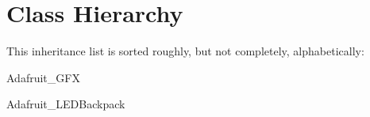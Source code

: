 \section{Class Hierarchy}
This inheritance list is sorted roughly, but not completely, alphabetically\+:\begin{DoxyCompactList}
\item Adafruit\+\_\+\+G\+FX\begin{DoxyCompactList}
\item {}
\begin{DoxyCompactList}
\item {}
\end{DoxyCompactList}
\end{DoxyCompactList}
\item Adafruit\+\_\+\+L\+E\+D\+Backpack\begin{DoxyCompactList}
\item {}
\end{DoxyCompactList}
\item {}
\end{DoxyCompactList}
